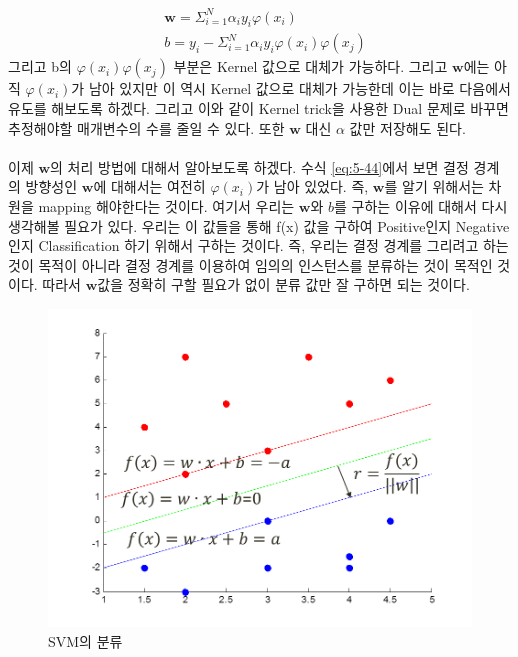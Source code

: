 \documentclass[a4paper]{oblivoir}
\begin{document}
\begin{align}
&\mathbf{w}=\Sigma_{i=1}^{N} \alpha_i y_i \varphi(x_i)\label{eq:5-44}\\
&b=y_i-\Sigma_{i=1}^{N} \alpha_i y_i \varphi(x_i)\varphi(x_j)\label{eq:5-45}
\end{align}
그리고 b의 $\varphi(x_i)\varphi(x_j)$ 부분은 Kernel 값으로 대체가 가능하다. 그리고 $\mathbf{w}$에는 아직 $\varphi(x_i)$가 남아 있지만 이 역시 Kernel 값으로 대체가 가능한데 이는 바로 다음에서 유도를 해보도록 하겠다. 그리고 이와 같이 Kernel trick을 사용한 Dual 문제로 바꾸면 추정해야할 매개변수의 수를 줄일 수 있다. 또한 $\mathbf{w}$ 대신 $\alpha$ 값만 저장해도 된다.\\\\

\indent 이제 $\mathbf{w}$의 처리 방법에 대해서 알아보도록 하겠다. 수식 \eqref{eq:5-44}에서 보면 결정 경계의 방향성인 $\mathbf{w}$에 대해서는 여전히 $\varphi(x_i)$가 남아 있었다. 즉, $\mathbf{w}$를 알기 위해서는 차원을 mapping 해야한다는 것이다. 여기서 우리는 $\mathbf{w}$와 $b$를 구하는 이유에 대해서 다시 생각해볼 필요가 있다. 우리는 이 값들을 통해 f(x) 값을 구하여 Positive인지 Negative인지 Classification 하기 위해서 구하는 것이다. 즉, 우리는 결정 경계를 그리려고 하는 것이 목적이 아니라 결정 경계를 이용하여 임의의 인스턴스를 분류하는 것이 목적인 것이다. 따라서 $\mathbf{w}$값을 정확히 구할 필요가 없이 분류 값만 잘 구하면 되는 것이다.
\begin{figure}[ht]\centering
\includegraphics[scale=0.5]{SVM_kerneltrick}\caption{SVM의 분류}\label{Fig:5-23}
\end{figure}\\
\end{document}
